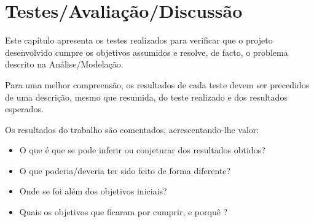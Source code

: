 \chapter{Testes/Avaliação/Discussão}\label{cap:test}

Este capítulo apresenta os testes realizados para verificar que o projeto desenvolvido cumpre os objetivos assumidos e resolve, de facto, o problema descrito na Análise/Modelação. 

Para uma melhor compreensão, os resultados de cada teste devem ser precedidos de uma descrição, mesmo que resumida, do teste realizado e dos resultados esperados.

Os resultados do trabalho são comentados, acrescentando-lhe valor:

\begin{itemize}
	\item  O que é que se pode inferir ou conjeturar dos resultados obtidos? 
	\item O que poderia/deveria ter sido feito de forma diferente? 
	\item Onde se foi além dos objetivos iniciais?
	\item  Quais os objetivos que ficaram por cumprir, e porquê ?
\end{itemize}

